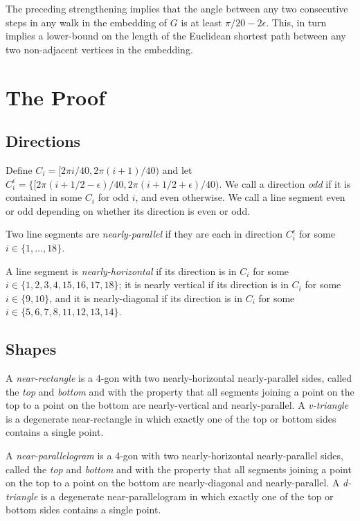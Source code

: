 \documentclass{patmorin}
\begin{document}
The preceding strengthening implies that the angle between any two
consecutive steps in any walk in the embedding of $G$ is at least
$\pi/20-2\epsilon$.  This, in turn implies a lower-bound on the length
of the Euclidean shortest path between any two non-adjacent vertices in
the embedding.

\section{The Proof}

\subsection{Directions}

Define $C_i=[2\pi i/40,2\pi(i+1)/40)$ and let $C_i^\epsilon = \{[2\pi
(i+1/2-\epsilon)/40,2\pi(i+1/2+\epsilon)/40)$.  We call a direction
\emph{odd} if it is contained in some $C_i$ for odd $i$, and even
otherwise.  We call a line segment even or odd depending on whether its
direction is even or odd.

Two line segments are \emph{nearly-parallel} if they are each in
direction $C_i^{\epsilon}$ for some $i\in\{1,\ldots,18\}$.  

A line segment is \emph{nearly-horizontal} if its direction is in
$C_i$ for some $i\in\{1,2,3,4,15,16,17,18\}$; it is nearly vertical
if its direction is in $C_i$ for some $i\in\{9,10\}$, and it is nearly-diagonal if its direction is in $C_i$ for some $i\in\{5,6,7,8,11,12,13,14\}$.

\subsection{Shapes}


A \emph{near-rectangle} is a 4-gon with two nearly-horizontal
nearly-parallel sides, called the \emph{top} and \emph{bottom} and with
the property that all segments joining a point on the top to a point on
the bottom are nearly-vertical and nearly-parallel.  A \emph{v-triangle}
is a degenerate near-rectangle in which exactly one of the top or bottom
sides contains a single point.

A \emph{near-parallelogram} is a 4-gon with two nearly-horizontal
nearly-parallel sides, called the \emph{top} and \emph{bottom} and with
the property that all segments joining a point on the top to a point on
the bottom are nearly-diagonal and nearly-parallel.  A \emph{d-triangle}
is a degenerate near-parallelogram in which exactly one of the top or bottom
sides contains a single point.
\end{document}
